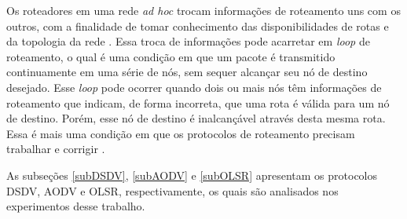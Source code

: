 Os roteadores em uma rede \textit{ad hoc} trocam informa\c{c}\~oes de roteamento uns com os outros, com a finalidade de tomar conhecimento das disponibilidades de rotas e da topologia da rede \cite{pereira}. 
Essa troca de informa\c{c}\~oes pode acarretar em \textit{loop} de roteamento, o qual \'e uma condi\c{c}\~ao em que um pacote \'e transmitido continuamente em uma s\'erie de n\'os, sem sequer alcan\c{c}ar seu n\'o de destino desejado. 
Esse \textit{loop} pode ocorrer quando dois ou mais n\'os t\^em informa\c{c}\~oes de roteamento que indicam, de forma incorreta, que uma rota \'e v\'alida para um n\'o de destino. Por\'em, esse n\'o de destino \'e inalcan\c{c}\'avel atrav\'es desta mesma rota. 
Essa \'e mais uma condi\c{c}\~ao em que os protocolos de roteamento precisam trabalhar e corrigir \cite{hengartnet}.

As subse\c{c}\~oes \ref{subDSDV}, \ref{subAODV} e \ref{subOLSR} apresentam os protocolos DSDV, AODV e OLSR, respectivamente, os quais s\~ao analisados nos experimentos desse trabalho.
